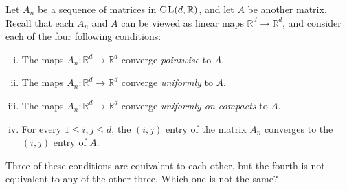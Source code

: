 \documentclass[12pt, letterpaper]{article}
\newcommand{\R}{\mathbb{R}}
\begin{document}
\begin{problem}{}
    Let $A_n$ be a sequence of matrices in $\textsc{GL}(d, \R)$, and let $A$ be
  another matrix. Recall that each $A_n$ and $A$ can be viewed as
  linear maps $\R^d \to \R^d$, and consider each of the four following
  conditions:
  \begin{enumerate}[(i)]
  \item The maps $A_n:\R^d \to \R^d$ converge \emph{pointwise} to $A$.
  \item The maps $A_n:\R^d \to \R^d$ converge \emph{uniformly} to $A$.
  \item The maps $A_n:\R^d \to \R^d$ converge \emph{uniformly on
      compacts} to $A$.
  \item For every $1 \le i,j \le d$, the $(i,j)$ entry of the matrix
    $A_n$ converges to the $(i,j)$ entry of $A$.
  \end{enumerate}

  Three of these conditions are equivalent to each other, but the
  fourth is not equivalent to any of the other three. Which one is not
  the same?
\end{problem}
\end{document}
